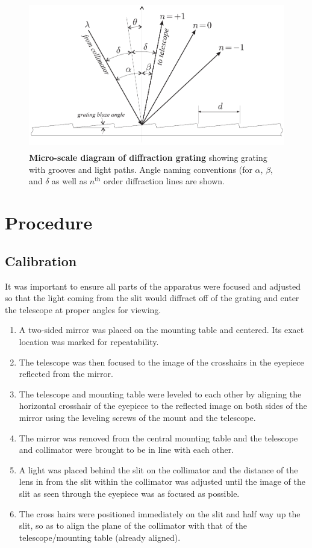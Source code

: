 \documentclass[paper=a4, fontsize=11pt]{scrartcl} %
\numberwithin{equation}{section}
\numberwithin{figure}{section}
\numberwithin{table}{section}
\begin{document}
\begin{figure}[H] \begin{center}
  \includegraphics[height=65mm]{grating1.png}
  \caption{\textbf{Micro-scale diagram of diffraction grating} showing grating with grooves and light paths. Angle naming conventions (for $\alpha$, $\beta$, and $\delta$ as well as $n^\mathrm{th}$ order diffraction lines are shown\cite{writeup}.}
  \label{fig:diagram1}
\end{center} \end{figure}


\section{Procedure}

\subsection{Calibration}

It was important to ensure all parts of the apparatus were focused and adjusted so that the light coming from the slit would diffract off of the grating and enter the telescope at proper angles for viewing.

\begin{enumerate}
\item A two-sided mirror was placed on the mounting table and centered. Its exact location was marked for repeatability.
\item The telescope was then focused to the image of the crosshairs in
  the eyepiece reflected from the mirror.
\item The telescope and mounting table were leveled to each other by
  aligning the horizontal crosshair of the eyepiece to the reflected
  image on both sides of the mirror using the leveling screws of the
  mount and the telescope.
\item The mirror was removed from the central mounting table and the telescope and collimator were brought to be in line with each other.
\item A light was placed behind the slit on the collimator and the distance of the lens in from the slit within the collimator was adjusted until the image of the slit as seen through the eyepiece was as focused as possible.
\item The cross hairs were positioned immediately on the slit and half way up the slit, so as to align the plane of the collimator with that of the telescope/mounting table (already aligned).
\end{enumerate}
\end{document}
